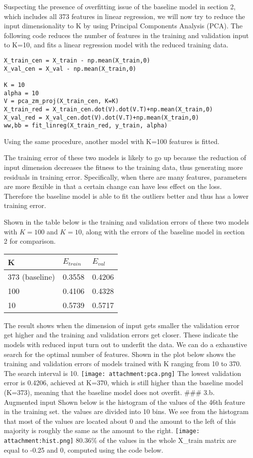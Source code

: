 \documentclass[11pt]{article}
\makeatletter
\def\maxwidth{\ifdim\Gin@nat@width>\linewidth\linewidth
    \else\Gin@nat@width\fi}
\let\Oldincludegraphics\includegraphics
\renewcommand{\includegraphics}[1]{\Oldincludegraphics[width=.8\maxwidth]{#1}}
\makeatother
\begin{document}
Suspecting the presence of overfitting issue of the baseline model in
section 2, which includes all 373 features in linear regression, we will
now try to reduce the input dimensionality to K by using Principal
Components Analysis (PCA). The following code reduces the number of
features in the training and validation input to K=10, and fits a linear
regression model with the reduced training data.

\begin{verbatim}
X_train_cen = X_train - np.mean(X_train,0)
X_val_cen = X_val - np.mean(X_train,0)

K = 10
alpha = 10
V = pca_zm_proj(X_train_cen, K=K)
X_train_red = X_train_cen.dot(V).dot(V.T)+np.mean(X_train,0)
X_val_red = X_val_cen.dot(V).dot(V.T)+np.mean(X_train,0)
ww,bb = fit_linreg(X_train_red, y_train, alpha)
\end{verbatim}

Using the same procedure, another model with K=100 features is fitted.

The training error of these two models is likely to go up because the
reduction of input dimension decreases the fitness to the training data,
thus generating more residuals in training error. Specifically, when
there are many features, parameters are more flexible in that a certain
change can have less effect on the loss. Therefore the baseline model is
able to fit the outliers better and thus has a lower training error.

Shown in the table below is the training and validation errors of these
two models with \(K=100\) and \(K=10\), along with the errors of the
baseline model in section 2 for comparison.

\begin{longtable}[]{@{}lll@{}}
\toprule
K & \(E_{train}\) & \(E_{val}\)\tabularnewline
\midrule
\endhead
373 (baseline) & 0.3558 & 0.4206\tabularnewline
100 & 0.4106 & 0.4328\tabularnewline
10 & 0.5739 & 0.5717\tabularnewline
\bottomrule
\end{longtable}

The result shows when the dimension of input gets smaller the validation
error get higher and the training and validation errors get closer.
These indicate the models with reduced input turn out to underfit the
data. We can do a exhaustive search for the optimal number of features.
Shown in the plot below shows the training and validation errors of
models trained with K ranging from 10 to 370. The search interval is 10.
\texttt{[image: attachment:pca.png]} The lowest validation error is
0.4206, achieved at K=370, which is still higher than the baseline model
(K=373), meaning that the baseline model does not overfit. \#\#\# 3.b.
Augmented input Shown below is the histogram of the values of the 46th
feature in the training set. the values are divided into 10 bins. We see
from the histogram that most of the values are located about 0 and the
amount to the left of this majority is roughly the same as the amount to
the right. \texttt{[image: attachment:hist.png]} 80.36\% of the values
in the whole X\_train matrix are equal to -0.25 and 0, computed using
the code below.
\end{document}
